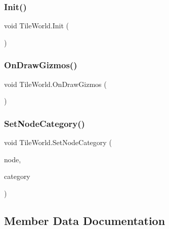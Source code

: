 \subsubsection{\texorpdfstring{Init()}{Init()}}
{\footnotesize\ttfamily void Tile\+World.\+Init (\begin{DoxyParamCaption}{ }\end{DoxyParamCaption})}

\mbox{\label{class_tile_world_ad06ad6b7b31c633d59cd494747070d9b}} 
\subsubsection{\texorpdfstring{On\+Draw\+Gizmos()}{OnDrawGizmos()}}
{\footnotesize\ttfamily void Tile\+World.\+On\+Draw\+Gizmos (\begin{DoxyParamCaption}{ }\end{DoxyParamCaption})}

\mbox{\label{class_tile_world_a377f2b3e756ec6d9eee11fad9fb3688f}} 
\subsubsection{\texorpdfstring{Set\+Node\+Category()}{SetNodeCategory()}}
{\footnotesize\ttfamily void Tile\+World.\+Set\+Node\+Category (\begin{DoxyParamCaption}\item[{\mbox{\hyperlink{struct_int_point}{Int\+Point}}}]{node,  }\item[{\mbox{\hyperlink{_graph_types_8cs_aeaefcb909e173fc6cbac62eca33b14f9}{Node\+Category}}}]{category }\end{DoxyParamCaption})}



\subsection{Member Data Documentation}
\mbox{\label{class_tile_world_abcf86ec3be82b6a58b64f7dad278b1e0}} 
